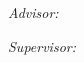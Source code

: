 \begin{titlepage}
\vfill\vfill\vfill
{ \large \center 
\textit{Advisor:}\\
\Advisor
}

\vfill
{ \large \center 
\textit{Supervisor:}\\
\Supervisor
}


 
\vfill %
\end{titlepage}

\cleardoublepage

\tableofcontents